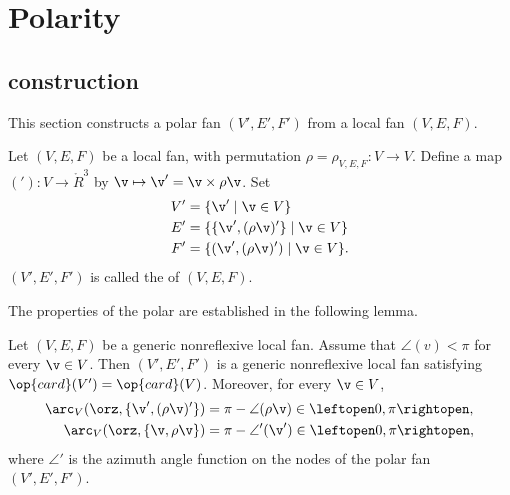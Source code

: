 \section{Polarity}


\subsection{construction}

This section constructs a polar fan $(V',E',F')$ from a local fan $(V,E,F)$.

\begin{definition}[polar]
  Let $(V,E,F)$ be a local fan, with permutation
  $\rho=\rho_{V,E,F}:V\to V$.  Define a map $('): V \to \ring{R}^3$ by
  $\v\mapsto\v' = \v\times\rho\v$.  Set
\begin{align*}
V' & = \{\v' \mid \v\in V\}\\
E' & = \{\{\v',(\rho\v)'\}\mid \v\in V\}\\
F' &=\{ (\v',(\rho\v)') \mid \v\in V\}.
\end{align*}
$(V',E',F')$ is called the  of $(V,E,F)$.
\end{definition}

The properties of the polar are established in the
following lemma.

\begin{lemma}\label{lemma:polar-fan}
  Let $(V,E,F)$ be a generic nonreflexive local fan. 
Assume that $\angle(v)<\pi$ for every $\v\in V$.  Then $(V',E',F')$ is
a generic nonreflexive local fan satisfying $\op{card}(V')=\op{card}(V)$.
Moreover, for every $\v\in V$,
\begin{align*}
\arc_V(\orz,\{\v',(\rho\v)'\}) &= \pi - \angle(\rho\v) \in \leftopen 0,\pi\rightopen,\\
\arc_V(\orz,\{\v,\rho\v\}) &= \pi - \angle'(\v')\in\leftopen 0,\pi\rightopen,
\end{align*}
where $\angle'$ is the azimuth angle function on the nodes of the polar fan $(V',E',F')$.
\end{lemma}


